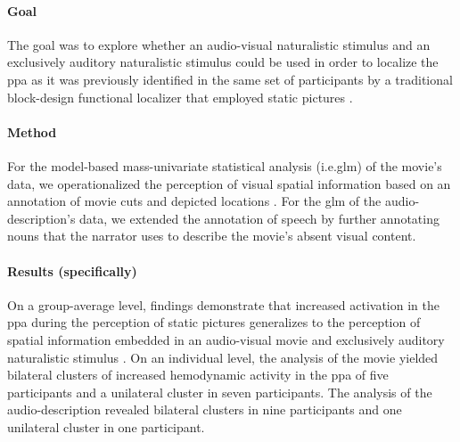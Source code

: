 

\paragraph{Goal}

The goal \citep{haeusler2022processing} was to explore whether an audio-visual
naturalistic stimulus and an exclusively auditory naturalistic stimulus could be
used in order to localize the \ac{ppa} as it was previously identified in the
same set of participants by a traditional block-design functional localizer that
employed static pictures \citep{sengupta2016extension}.

\paragraph{Method}

For the model-based mass-univariate statistical analysis (i.e.\ac{glm}) of the
movie's data, we operationalized the perception of visual spatial information
based on an annotation of movie cuts and depicted locations
\citep{haeusler2016cutanno}.
For the \ac{glm} of the audio-description's data, we extended the annotation of
speech \citep{haeusler2021speechanno} by further annotating nouns that the
narrator uses to describe the movie's absent visual content.


\paragraph{Results (specifically)}


On a group-average level, findings demonstrate that increased activation in the
\ac{ppa} during the perception of static pictures generalizes to the perception
of spatial information embedded in an audio-visual movie and exclusively
auditory naturalistic stimulus \citep{haeusler2022processing}.
On an individual level, the analysis of the movie yielded bilateral
clusters of increased hemodynamic activity in the \ac{ppa} of five participants
and a unilateral cluster in seven participants.
%
The analysis of the audio-description revealed bilateral clusters in nine
participants and one unilateral cluster in one participant.

